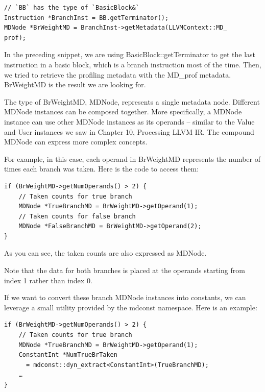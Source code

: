 \begin{lstlisting}[style=styleCXX]
// `BB` has the type of `BasicBlock&`
Instruction *BranchInst = BB.getTerminator();
MDNode *BrWeightMD = BranchInst->getMetadata(LLVMContext::MD_
prof);
\end{lstlisting}

In the preceding snippet, we are using BasicBlock::getTerminator to get the last instruction in a basic block, which is a branch instruction most of the time. Then, we tried to retrieve the profiling metadata with the MD\_prof metadata. BrWeightMD is the result we are looking for.
 
The type of BrWeightMD, MDNode, represents a single metadata node. Different MDNode instances can be composed together. More specifically, a MDNode instance can use other MDNode instances as its operands – similar to the Value and User instances we saw in Chapter 10, Processing LLVM IR. The compound MDNode can express more complex concepts.

For example, in this case, each operand in BrWeightMD represents the number of times each branch was taken. Here is the code to access them:

\begin{lstlisting}[style=styleCXX]
if (BrWeightMD->getNumOperands() > 2) {
	// Taken counts for true branch
	MDNode *TrueBranchMD = BrWeightMD->getOperand(1);
	// Taken counts for false branch
	MDNode *FalseBranchMD = BrWeightMD->getOperand(2);
}
\end{lstlisting}

As you can see, the taken counts are also expressed as MDNode.

\begin{tcolorbox}[colback=blue!5!white,colframe=blue!75!black, fonttitle=\bfseries,title=Operand indices for both branches]	
\hspace*{0.7cm}Note that the data for both branches is placed at the operands starting from index 1 rather than index 0.
\end{tcolorbox}

If we want to convert these branch MDNode instances into constants, we can leverage a small utility provided by the mdconst namespace. Here is an example:

\begin{lstlisting}[style=styleCXX]
if (BrWeightMD->getNumOperands() > 2) {
	// Taken counts for true branch
	MDNode *TrueBranchMD = BrWeightMD->getOperand(1);
	ConstantInt *NumTrueBrTaken
	  = mdconst::dyn_extract<ConstantInt>(TrueBranchMD);
	…
}
\end{lstlisting}

